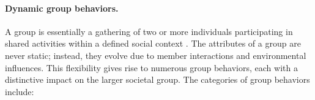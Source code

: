 \paragraph{Dynamic group behaviors.}
A group is essentially a gathering of two or more individuals participating in shared activities within a defined social context \cite{abrams2020c}. 
The attributes of a group are never static; instead, they evolve due to member interactions and environmental influences. 
This flexibility gives rise to numerous group behaviors, each with a distinctive impact on the larger societal group.
The categories of group behaviors include:
